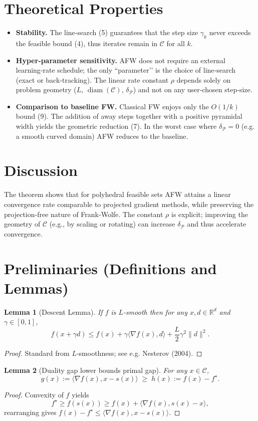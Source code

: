 \documentclass{article}
\newtheorem{lemma}{Lemma}
\newcommand{\gap}{g}
\newcommand{\diam}{\operatorname{diam}}
\newcommand{\pyr}{\delta_{\mathcal{P}}}
\newcommand{\C}{\mathcal{C}}
\begin{document}
\section*{Theoretical Properties}
\begin{itemize}[leftmargin=*]
\item \textbf{Stability.} The line‑search (5) guarantees that the step size $\gamma_k$ never exceeds the feasible bound (4), thus iterates remain in $\C$ for all $k$.
\item \textbf{Hyper‑parameter sensitivity.} AFW does not require an external learning‑rate schedule; the only “parameter’’ is the choice of line‑search (exact or back‑tracking). The linear rate constant $\rho$ depends solely on problem geometry ($L$, $\diam(\C)$, $\pyr$) and not on any user‑chosen step‑size.
\item \textbf{Comparison to baseline FW.} Classical FW enjoys only the $O(1/k)$ bound (9). The addition of away steps together with a positive pyramidal width yields the geometric reduction (7). In the worst case where $\pyr=0$ (e.g. a smooth curved domain) AFW reduces to the baseline.
\end{itemize}

\section*{Discussion}
The theorem shows that for polyhedral feasible sets AFW attains a linear convergence rate comparable to projected gradient methods, while preserving the projection‑free nature of Frank‑Wolfe. The constant $\rho$ is explicit; improving the geometry of $\C$ (e.g., by scaling or rotating) can increase $\pyr$ and thus accelerate convergence.

\newpage
\section*{Preliminaries (Definitions and Lemmas)}
\begin{lemma}[Descent Lemma]\label{lem:descent}
If $f$ is $L$‑smooth then for any $x,d\in\mathbb{R}^d$ and $\gamma\in[0,1]$,
\[
f(x+\gamma d)\le f(x)+\gamma\langle\nabla f(x),d\rangle+\frac{L}{2}\gamma^{2}\|d\|^{2}.
\tag{L1}
\]
\end{lemma}
\begin{proof}
Standard from $L$‑smoothness; see e.g. Nesterov (2004). \qedhere
\end{proof}

\begin{lemma}[Duality gap lower bounds primal gap]\label{lem:gap}
For any $x\in\C$,
\[
\gap(x):=\langle\nabla f(x),x-s(x)\rangle\;\ge\;h(x):=f(x)-f^\star.
\tag{L2}
\]
\end{lemma}
\begin{proof}
Convexity of $f$ yields
\[
f^\star\ge f(s(x))\ge f(x)+\langle\nabla f(x),s(x)-x\rangle,
\]
rearranging gives $f(x)-f^\star\le\langle\nabla f(x),x-s(x)\rangle$. \qedhere
\end{proof}
\end{document}

